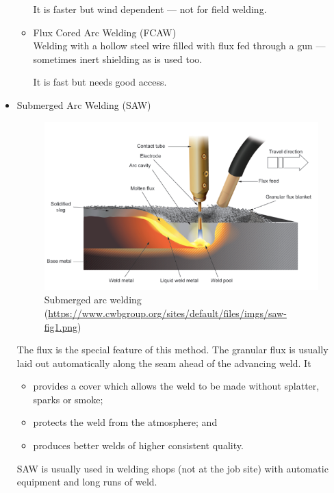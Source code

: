 \begin{itemize}
\begin{itemize}
It is faster but wind dependent --- not for field welding.
\item Flux Cored Arc Welding (FCAW)\\Welding with a hollow steel wire filled with flux fed through a gun --- sometimes inert shielding as is used too.

It is fast but needs good access.
\end{itemize}
\item Submerged Arc Welding (SAW)
\begin{figure}[H]\centering
\includegraphics[scale=.9]{PIC/CH07/SAW}
\caption{Submerged arc welding (\href{https://www.cwbgroup.org/sites/default/files/imgs/saw-fig1.png}{\url{https://www.cwbgroup.org/sites/default/files/imgs/saw-fig1.png}})}
\end{figure}
The flux is the special feature of this method. The granular flux is usually laid out automatically along the seam ahead of the advancing weld. It
\begin{itemize}
\item provides a cover which allows the weld to be made without splatter, sparks or smoke;
\item protects the weld from the atmosphere; and
\item produces better welds of higher consistent quality.
\end{itemize}
SAW is usually used in welding shops (not at the job site) with automatic equipment and long runs of weld.
\end{itemize}
